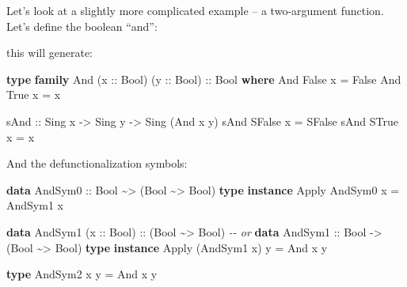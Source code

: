 \documentclass[]{article}
\newenvironment{Shaded}{}{}
\newcommand{\CommentTok}[1]{\textcolor[rgb]{0.38,0.63,0.69}{\textit{#1}}}
\newcommand{\DataTypeTok}[1]{\textcolor[rgb]{0.56,0.13,0.00}{#1}}
\newcommand{\KeywordTok}[1]{\textcolor[rgb]{0.00,0.44,0.13}{\textbf{#1}}}
\newcommand{\NormalTok}[1]{#1}
\newcommand{\OperatorTok}[1]{\textcolor[rgb]{0.40,0.40,0.40}{#1}}
\newcommand{\OtherTok}[1]{\textcolor[rgb]{0.00,0.44,0.13}{#1}}
\begin{document}
Let's look at a slightly more complicated example -- a two-argument function.
Let's define the boolean ``and'':

\begin{Shaded}
\end{Shaded}

this will generate:

\begin{Shaded}
\begin{Highlighting}[]
\KeywordTok{type} \KeywordTok{family} \DataTypeTok{And}\NormalTok{ (}\OtherTok{x ::} \DataTypeTok{Bool}\NormalTok{) (}\OtherTok{y ::} \DataTypeTok{Bool}\NormalTok{)}\OtherTok{ ::} \DataTypeTok{Bool} \KeywordTok{where}
    \DataTypeTok{And} \DataTypeTok{\textquotesingle{}False}\NormalTok{ x }\OtherTok{=} \DataTypeTok{\textquotesingle{}False}
    \DataTypeTok{And} \DataTypeTok{\textquotesingle{}True}\NormalTok{  x }\OtherTok{=}\NormalTok{ x}

\OtherTok{sAnd ::} \DataTypeTok{Sing}\NormalTok{ x }\OtherTok{{-}\textgreater{}} \DataTypeTok{Sing}\NormalTok{ y }\OtherTok{{-}\textgreater{}} \DataTypeTok{Sing}\NormalTok{ (}\DataTypeTok{And}\NormalTok{ x y)}
\NormalTok{sAnd }\DataTypeTok{SFalse}\NormalTok{ x }\OtherTok{=} \DataTypeTok{SFalse}
\NormalTok{sAnd }\DataTypeTok{STrue}\NormalTok{  x }\OtherTok{=}\NormalTok{ x}
\end{Highlighting}
\end{Shaded}

And the defunctionalization symbols:

\begin{Shaded}
\begin{Highlighting}[]
\KeywordTok{data} \DataTypeTok{AndSym0}\OtherTok{ ::} \DataTypeTok{Bool} \OperatorTok{\textasciitilde{}\textgreater{}}\NormalTok{ (}\DataTypeTok{Bool} \OperatorTok{\textasciitilde{}\textgreater{}} \DataTypeTok{Bool}\NormalTok{)}
\KeywordTok{type} \KeywordTok{instance} \DataTypeTok{Apply} \DataTypeTok{AndSym0}\NormalTok{ x }\OtherTok{=} \DataTypeTok{AndSym1}\NormalTok{ x}

\KeywordTok{data} \DataTypeTok{AndSym1}\NormalTok{ (}\OtherTok{x ::} \DataTypeTok{Bool}\NormalTok{)}\OtherTok{ ::}\NormalTok{ (}\DataTypeTok{Bool} \OperatorTok{\textasciitilde{}\textgreater{}} \DataTypeTok{Bool}\NormalTok{)}
\CommentTok{{-}{-} or}
\KeywordTok{data} \DataTypeTok{AndSym1}\OtherTok{ ::} \DataTypeTok{Bool} \OtherTok{{-}\textgreater{}}\NormalTok{ (}\DataTypeTok{Bool} \OperatorTok{\textasciitilde{}\textgreater{}} \DataTypeTok{Bool}\NormalTok{)}
\KeywordTok{type} \KeywordTok{instance} \DataTypeTok{Apply}\NormalTok{ (}\DataTypeTok{AndSym1}\NormalTok{ x) y }\OtherTok{=} \DataTypeTok{And}\NormalTok{ x y}

\KeywordTok{type} \DataTypeTok{AndSym2}\NormalTok{ x y }\OtherTok{=} \DataTypeTok{And}\NormalTok{ x y}
\end{Highlighting}
\end{Shaded}
\end{document}
